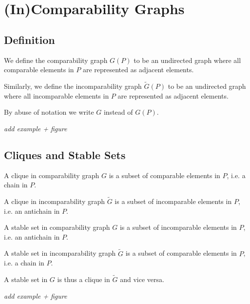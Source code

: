 \section{(In)Comparability Graphs}



\subsection{Definition}

We define the comparability graph ${G}(P)$ to be an undirected graph where all comparable elements in $P$ are represented as adjacent elements.

Similarly, we define the incomparability graph $\widetilde{G}(P)$ to be an undirected graph where all incomparable elements in $P$ are represented as adjacent elements.

By abuse of notation we write ${G}$ instead of ${G}(P)$.

\emph{add example + figure}





\subsection{Cliques and Stable Sets}


A clique in comparability graph ${G}$ is a subset of comparable  elements in ${P}$, i.e. a chain in ${P}$.

A clique in incomparability graph $\widetilde{G}$ is a subset of incomparable  elements in ${P}$, i.e. an antichain in ${P}$.


A stable set in comparability graph ${G}$ is a subset of incomparable elements in ${P}$, i.e. an antichain in ${P}$.

A stable set in incomparability graph $\widetilde{G}$ is a subset of comparable elements in ${P}$, i.e. a chain in ${P}$.


A stable set in ${G}$ is thus a clique in $\widetilde{G}$ and vice versa.

\emph{add example + figure}





